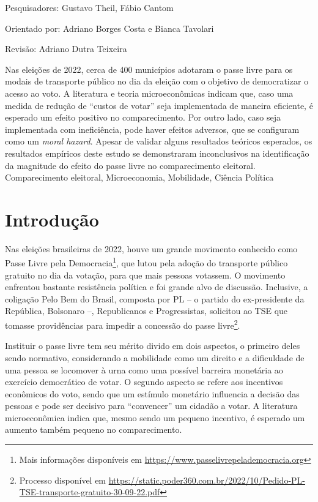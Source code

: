     {
        \noindent Pesquisadores: Gustavo Theil, Fábio Cantom

        \noindent Orientado por: Adriano Borges Costa e Bianca Tavolari

        \noindent Revisão: Adriano Dutra Teixeira
    }
    {
        Nas eleições de 2022, cerca de 400 municípios adotaram o passe livre para os modais de transporte público no dia da eleição com o objetivo de democratizar o acesso ao voto. A literatura e teoria microeconômicas indicam que, caso uma medida de redução de ``custos de votar'' seja implementada de maneira eficiente, é esperado um efeito positivo no comparecimento. Por outro lado, caso seja implementada com ineficiência, pode haver efeitos adversos, que se configuram como um \textit{moral hazard}. Apesar de validar alguns resultados teóricos esperados, os resultados empíricos deste estudo se demonstraram inconclusivos na identificação da magnitude do efeito do passe livre no comparecimento eleitoral. 
    }
    {Comparecimento eleitoral, Microeconomia, Mobilidade, Ciência Política}

\section{Introdução}

Nas eleições brasileiras de 2022, houve um grande movimento conhecido como Passe Livre pela Democracia\footnote{Mais informações disponíveis em \url{https://www.passelivrepelademocracia.org}}, que lutou pela adoção do transporte público gratuito no dia da votação, para que mais pessoas votassem. O movimento enfrentou bastante resistência política e foi grande alvo de discussão. Inclusive, a coligação Pelo Bem do Brasil, composta por PL -- o partido do ex-presidente da República, Bolsonaro --, Republicanos e Progressistas, solicitou ao TSE que tomasse providências para impedir a concessão do passe livre\footnote{Processo disponível em \url{https://static.poder360.com.br/2022/10/Pedido-PL-TSE-transporte-gratuito-30-09-22.pdf}}.

Instituir o passe livre tem seu mérito divido em dois aspectos, o primeiro deles sendo normativo, considerando a mobilidade como um direito e a dificuldade de uma pessoa se locomover à urna como uma possível barreira monetária ao exercício democrático de votar. O segundo aspecto se refere aos incentivos econômicos do voto, sendo que um estímulo monetário influencia a decisão das pessoas e pode ser decisivo para ``convencer'' um cidadão a votar. A literatura microeconômica indica que, mesmo sendo um pequeno incentivo, é esperado um aumento também pequeno no comparecimento.

